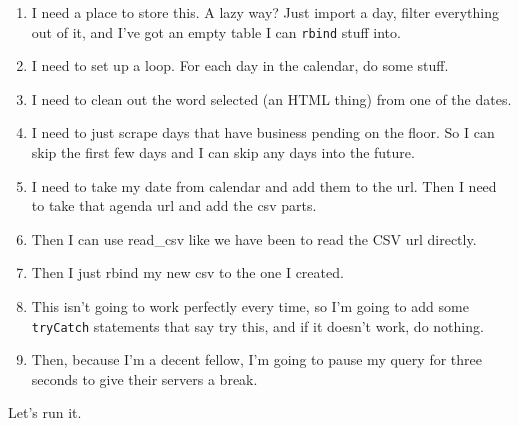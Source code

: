 \documentclass[]{book}
\providecommand{\tightlist}{%
  \setlength{\itemsep}{0pt}\setlength{\parskip}{0pt}}
\begin{document}
\begin{enumerate}
\def\labelenumi{\arabic{enumi}.}
\tightlist
\item
  I need a place to store this. A lazy way? Just import a day, filter everything out of it, and I've got an empty table I can \texttt{rbind} stuff into.
\item
  I need to set up a loop. For each day in the calendar, do some stuff.
\item
  I need to clean out the word selected (an HTML thing) from one of the dates.
\item
  I need to just scrape days that have business pending on the floor. So I can skip the first few days and I can skip any days into the future.
\item
  I need to take my date from calendar and add them to the url. Then I need to take that agenda url and add the csv parts.
\item
  Then I can use read\_csv like we have been to read the CSV url directly.
\item
  Then I just rbind my new csv to the one I created.
\item
  This isn't going to work perfectly every time, so I'm going to add some \texttt{tryCatch} statements that say try this, and if it doesn't work, do nothing.
\item
  Then, because I'm a decent fellow, I'm going to pause my query for three seconds to give their servers a break.
\end{enumerate}

Let's run it.
\end{document}
